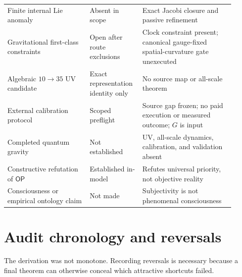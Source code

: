 \documentclass[11pt]{article}
\theoremstyle{definition}
\theoremstyle{remark}
\newcommand{\OPT}{\mathsf{OP}}
\begin{document}
\begin{longtable}{>{\raggedright\arraybackslash}p{0.34\linewidth} >{\raggedright\arraybackslash}p{0.19\linewidth} >{\raggedright\arraybackslash}p{0.38\linewidth}}
Finite internal Lie anomaly & Absent in scope & Exact Jacobi closure and passive refinement \\
Gravitational first-class constraints & Open after route exclusions & Clock constraint present; canonical gauge-fixed spatial-curvature gate unexecuted \\
Algebraic $10\to35$ UV candidate & Exact representation identity only & No source map or all-scale theorem \\
External calibration protocol & Scoped preflight & Source gap frozen; no paid execution or measured outcome; $G$ is input \\
Completed quantum gravity & Not established & UV, all-scale dynamics, calibration, and validation absent \\
Constructive refutation of $\OPT$ & Established in-model & Refutes universal priority, not objective reality \\
Consciousness or empirical ontology claim & Not made & Subjectivity is not phenomenal consciousness \\
\bottomrule
\end{longtable}

\section{Audit chronology and reversals}

The derivation was not monotone. Recording reversals is necessary because a final theorem can otherwise conceal which attractive shortcuts failed.
\end{document}
